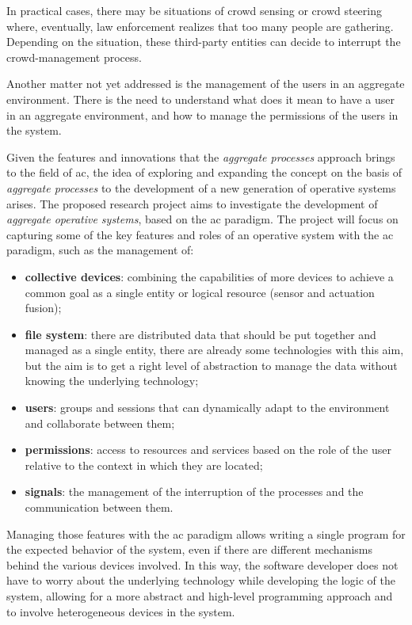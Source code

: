 \documentclass[12pt, a4paper]{article}
\begin{document}
In practical cases, there may be situations of crowd sensing or crowd steering where,
eventually,
law enforcement realizes that too many people are gathering.
%
Depending on the situation,
these third-party entities can decide to interrupt the crowd-management process.

Another matter not yet addressed is the management of the users in an aggregate environment.
%
There is the need to understand what does it mean to have a user in an aggregate environment,
and how to manage the permissions of the users in the system.

Given the features and innovations that the \emph{aggregate processes} approach brings to the field of \ac{ac},
the idea of exploring and expanding the concept on the basis of \emph{aggregate processes} to the development
of a new generation of operative systems arises.
%
The proposed research project aims to investigate the development of \emph{aggregate operative systems},
based on the \ac{ac} paradigm.
%
The project will focus on capturing some of the key features and roles of an operative system with the \ac{ac} paradigm,
such as the management of:
\begin{itemize}
    \item \textbf{collective devices}: combining the capabilities of more devices to achieve a common goal as a single
        entity or logical resource (sensor and actuation fusion);
    \item \textbf{file system}: there are distributed data that should be put together and managed as a single entity,
        there are already some technologies with this aim, but the aim is to get a right level of abstraction to manage the data
        without knowing the underlying technology;
    \item \textbf{users}: groups and sessions that can dynamically adapt to the environment and collaborate between them;
    \item \textbf{permissions}: access to resources and services based on the role of the user relative to the context in which they are located;
    \item \textbf{signals}: the management of the interruption of the processes and the communication between them.
\end{itemize}

Managing those features with the \ac{ac} paradigm allows
writing a single program for the expected behavior of the system,
even if there are different mechanisms behind the various devices involved.
%
In this way,
the software developer does not have to worry about the underlying technology while developing the logic of the system,
allowing for a more abstract and high-level programming approach and to involve heterogeneous devices in the system.
\end{document}
